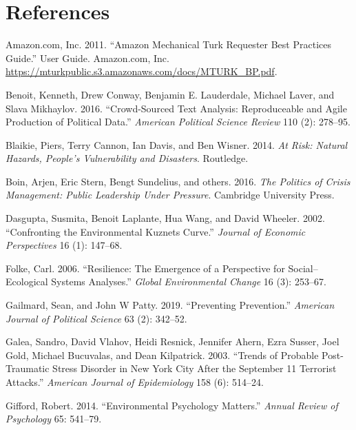 \documentclass[]{article}
\begin{document}
\hypertarget{references}{%
\section*{References}\label{references}}

\hypertarget{refs}{}
\leavevmode\hypertarget{ref-MTurk2011}{}%
Amazon.com, Inc. 2011. ``Amazon Mechanical Turk Requester Best Practices Guide.'' User Guide. Amazon.com, Inc. \url{https://mturkpublic.s3.amazonaws.com/docs/MTURK_BP.pdf}.

\leavevmode\hypertarget{ref-benoitetal2016}{}%
Benoit, Kenneth, Drew Conway, Benjamin E. Lauderdale, Michael Laver, and Slava Mikhaylov. 2016. ``Crowd-Sourced Text Analysis: Reproduceable and Agile Production of Political Data.'' \emph{American Political Science Review} 110 (2): 278--95.

\leavevmode\hypertarget{ref-blaikie2014risk}{}%
Blaikie, Piers, Terry Cannon, Ian Davis, and Ben Wisner. 2014. \emph{At Risk: Natural Hazards, People's Vulnerability and Disasters}. Routledge.

\leavevmode\hypertarget{ref-boin2016politics}{}%
Boin, Arjen, Eric Stern, Bengt Sundelius, and others. 2016. \emph{The Politics of Crisis Management: Public Leadership Under Pressure}. Cambridge University Press.

\leavevmode\hypertarget{ref-dasgupta2002confronting}{}%
Dasgupta, Susmita, Benoit Laplante, Hua Wang, and David Wheeler. 2002. ``Confronting the Environmental Kuznets Curve.'' \emph{Journal of Economic Perspectives} 16 (1): 147--68.

\leavevmode\hypertarget{ref-folke2006resilience}{}%
Folke, Carl. 2006. ``Resilience: The Emergence of a Perspective for Social--Ecological Systems Analyses.'' \emph{Global Environmental Change} 16 (3): 253--67.

\leavevmode\hypertarget{ref-gailmard2019preventing}{}%
Gailmard, Sean, and John W Patty. 2019. ``Preventing Prevention.'' \emph{American Journal of Political Science} 63 (2): 342--52.

\leavevmode\hypertarget{ref-galea2003trends}{}%
Galea, Sandro, David Vlahov, Heidi Resnick, Jennifer Ahern, Ezra Susser, Joel Gold, Michael Bucuvalas, and Dean Kilpatrick. 2003. ``Trends of Probable Post-Traumatic Stress Disorder in New York City After the September 11 Terrorist Attacks.'' \emph{American Journal of Epidemiology} 158 (6): 514--24.

\leavevmode\hypertarget{ref-gifford2014environmental}{}%
Gifford, Robert. 2014. ``Environmental Psychology Matters.'' \emph{Annual Review of Psychology} 65: 541--79.
\end{document}
